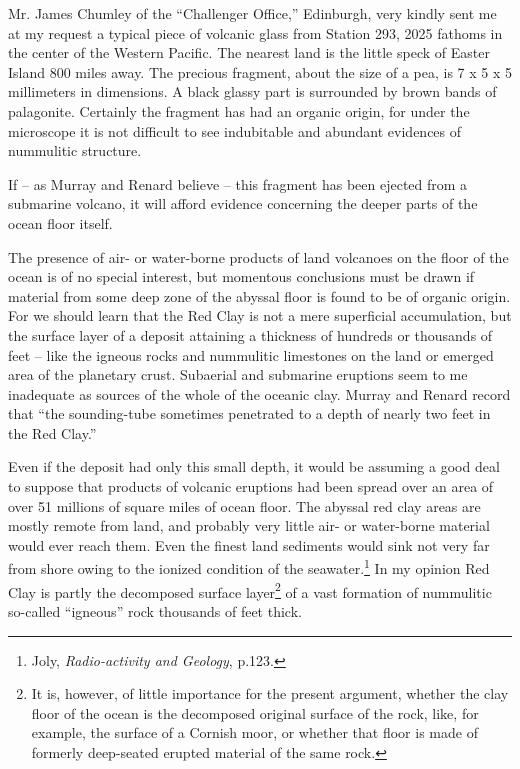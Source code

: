 \documentclass[a4paper, 12pt, oneside]{article}
\begin{document}
Mr. James Chumley of the ``Challenger Office,'' Edinburgh, very kindly sent me at my request a typical piece of volcanic glass from Station 293, 2025 fathoms in the center of the Western Pacific. The nearest land is the little speck of Easter Island 800 miles away. The precious fragment, about the size of a pea, is 7 x 5 x 5 millimeters in dimensions. A black glassy part is surrounded by brown bands of palagonite. Certainly the fragment has had an organic origin, for under the microscope it is not difficult to see indubitable and abundant evidences of nummulitic structure.

If -- as Murray and Renard believe -- this fragment has been ejected from a submarine volcano, it will afford evidence concerning the deeper parts of the ocean floor itself.

The presence of air- or water-borne products of land volcanoes on the floor of the ocean is of no special interest, but momentous conclusions must be drawn if material from some deep zone of the abyssal floor is found to be of organic origin. For we should learn that the Red Clay is not a mere superficial accumulation, but the surface layer of a deposit attaining a thickness of hundreds or thousands of feet -- like the igneous rocks and nummulitic limestones on the land or emerged area of the planetary crust. Subaerial and submarine eruptions seem to me inadequate as sources of the whole of the oceanic clay. Murray and Renard record that ``the sounding-tube sometimes penetrated to a depth of nearly two feet in the Red Clay.''

Even if the deposit had only this small depth, it would be assuming a good deal to suppose that products of volcanic eruptions had been spread over an area of over 51 millions of square miles of ocean floor. The abyssal red clay areas are mostly remote from land, and probably very little air- or water-borne material would ever reach them. Even the finest land sediments would sink not very far from shore owing to the ionized condition of the seawater.\footnote{Joly, \emph{Radio-activity and Geology}, p.123.} In my opinion Red Clay is partly the decomposed surface layer\footnote{It is, however, of little importance for the present argument, whether the clay floor of the ocean is the decomposed original surface of the rock, like, for example, the surface of a Cornish moor, or whether that floor is made of formerly deep-seated erupted material of the same rock.} of a vast formation of nummulitic so-called ``igneous'' rock thousands of feet thick.
\end{document}
